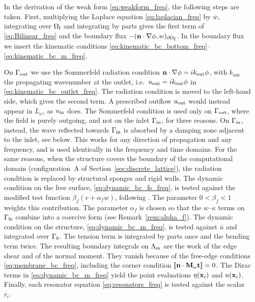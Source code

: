 In the derivation of the weak form \eqref{eq:weakform_freq}, the following steps are taken. First, multiplying the Laplace equation \eqref{eq:laplacian_freq} by $\overline{w}$, integrating over $\Omega_{\mbox{\scriptsize f}}$ and integrating by parts gives the first term of \eqref{eq:Bilinear_freq} and the boundary flux $-(\mathbf{n}\cdot\nabla\phi,w)_{\partial\Omega_{\mbox{\scriptsize f}}}$. In the boundary flux we insert the kinematic conditions \eqref{eq:kinematic_bc_bottom_freq}--\eqref{eq:kinematic_bc_m_freq}. 

On $\Gamma_{\mbox{\scriptsize out}}$ we use the Sommerfeld radiation condition $\mathbf{n}\cdot\nabla\phi=ik_{\mathrm{out}}\phi$, with $k_{\mathrm{out}}$ the propagating wavenumber at the outlet, i.e.\ $u_{\text{\scriptsize out}}=ik_{\mathrm{out}}\phi$ in \eqref{eq:kinematic_bc_outlet_freq}. The radiation condition is moved to the left-hand side, which gives the second term. A prescribed outflow $u_{\text{\scriptsize out}}$ would instead appear in $L_\omega$, as $u_{\text{\scriptsize in}}$ does. The Sommerfeld condition is used only on $\Gamma_{\mbox{\scriptsize out}}$, where the field is purely outgoing, and not on the inlet $\Gamma_{\mbox{\scriptsize in}}$, for three reasons. On $\Gamma_{\mbox{\scriptsize in}}$, instead, the wave reflected towards $\Gamma_{\mbox{\scriptsize in}}$ is absorbed by a damping zone adjacent to the inlet, see below. This works for any direction of propagation and any frequency, and is used identically in the frequency and time domains. For the same reasons, when the structure covers the boundary of the computational domain (configuration~A of Section~\ref{sec:discrete_lattice}), the radiation condition is replaced by structural sponges and rigid walls.
%
The dynamic condition on the free surface, \eqref{eq:dynamic_bc_fs_freq}, is tested against the modified test function $\beta_f(v+\alpha_f w)$, following \cite{akkerman2020isogeometric,colomes2023monolithic}. The parameter $0<\beta_f<1$ weights this contribution. The parameter $\alpha_f$ is chosen so that the $w$--$\kappa$ terms on $\Gamma_{\mbox{\scriptsize fs}}$ combine into a coercive form (see Remark~\ref{rem:alpha_f}).
%
The dynamic condition on the structure, \eqref{eq:dynamic_bc_m_freq}, is tested against $\overline{u}$ and integrated over $\Gamma_{\mbox{s}}$. The tension term is integrated by parts once and the bending term twice. The resulting boundary integrals on $\Lambda_{\mbox{\scriptsize m}}$ are the work of the edge shear and of the normal moment. They vanish because of the free-edge conditions \eqref{eq:membrane_bc_freq}, including the corner condition $[\![\mathbf{n}\cdot\mathbf{M}_\omega\mathbf{t}]\!]=0$.
%
The Dirac terms in \eqref{eq:dynamic_bc_m_freq} yield the point evaluations $\eta(\mathbf{x}_i)$ and $u(\mathbf{x}_i)$.
%
Finally, each resonator equation \eqref{eq:resonators_freq} is tested against the scalar $\overline{r_i}$.


